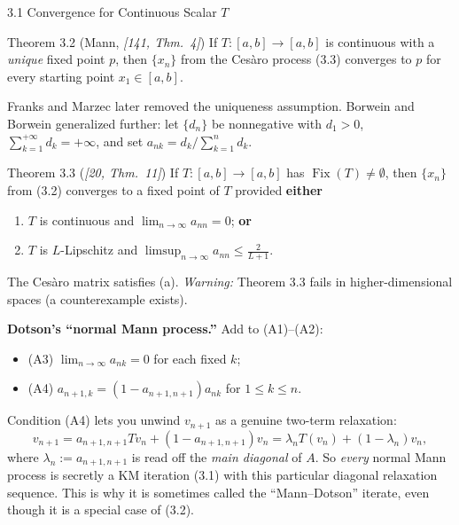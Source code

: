\documentclass[aspectratio=169,10pt]{beamer}
\newcommand{\Fix}{\operatorname{Fix}}
\begin{document}
\begin{frame}[allowframebreaks]{3.1 Convergence for Continuous Scalar $T$}

  \begin{block}{Theorem 3.2 (Mann, \emph{[141, Thm.\ 4]})}
    If $T:[a,b]\to[a,b]$ is continuous with a \emph{unique} fixed
    point $p$, then $\{x_n\}$ from the Ces\`aro process (3.3) converges
    to $p$ for every starting point $x_1\in[a,b]$.
  \end{block}

  Franks and Marzec later removed the uniqueness assumption. Borwein
  and Borwein generalized further: let $\{d_n\}$ be nonnegative with
  $d_1>0$, $\sum_{k=1}^{+\infty}d_k=+\infty$, and set
  $a_{nk}=d_k/\sum_{k=1}^n d_k$.

  \begin{block}{Theorem 3.3 (\emph{[20, Thm.\ 11]})}
    If $T:[a,b]\to[a,b]$ has $\Fix(T)\ne\emptyset$, then $\{x_n\}$ from
    (3.2) converges to a fixed point of $T$ provided \textbf{either}
    \begin{enumerate}
      \item[(a)] $T$ is continuous and $\displaystyle\lim_{n\to\infty}a_{nn}=0$; \textbf{or}
      \item[(b)] $T$ is $L$-Lipschitz and
        $\displaystyle\limsup_{n\to\infty}a_{nn}\le\frac{2}{L+1}$.
    \end{enumerate}
  \end{block}
  The Ces\`aro matrix satisfies (a). \emph{Warning:} Theorem 3.3 fails
  in higher-dimensional spaces (a counterexample exists).

  \framebreak

  \textbf{Dotson's ``normal Mann process.''} Add to (A1)--(A2):
  \begin{itemize}
    \item (A3) $\lim_{n\to\infty}a_{nk}=0$ for each fixed $k$;
    \item (A4) $a_{n+1,k}=(1-a_{n+1,n+1})a_{nk}$ for $1\le k\le n$.
  \end{itemize}
  Condition (A4) lets you unwind $v_{n+1}$ as a genuine two-term
  relaxation:
  $$v_{n+1}=a_{n+1,n+1}Tv_n+(1-a_{n+1,n+1})v_n
           =\lambda_n T(v_n)+(1-\lambda_n)v_n,$$
  where $\lambda_n:=a_{n+1,n+1}$ is read off the \emph{main diagonal} of
  $A$. So \emph{every} normal Mann process is secretly a KM iteration
  (3.1) with this particular diagonal relaxation sequence. This is why
  it is sometimes called the ``Mann--Dotson'' iterate, even though it is
  a special case of (3.2).
\end{frame}
\end{document}

